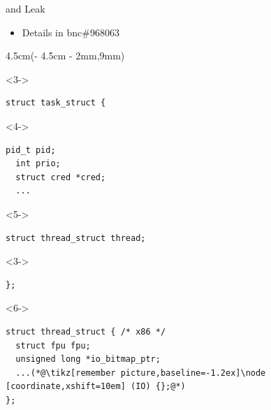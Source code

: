 \begin{frame}[fragile]{\trin and  Leak}
\begin{itemize}
    \pause

    \item Details in bnc\#968063
  \end{itemize}

  \begin{textblock*}{4.5cm}(\paperwidth - 4.5cm - 2mm,9mm)
  \begin{onlyenv}<3->
  \begin{lstlisting}[belowskip=0pt]
struct task_struct {
  \end{lstlisting}
  \end{onlyenv}
  \begin{visibleenv}<4->
  \begin{lstlisting}[aboveskip=0pt,belowskip=0pt]
  pid_t pid;
  int prio;
  struct cred *cred;
  ...
  \end{lstlisting}
  \end{visibleenv}
  \begin{visibleenv}<5->
  \begin{lstlisting}[aboveskip=0pt,belowskip=0pt]
  struct thread_struct thread;
  \end{lstlisting}
  \end{visibleenv}
  \begin{onlyenv}<3->
  \begin{lstlisting}[aboveskip=0pt,belowskip=0pt]
};
  \end{lstlisting}
  \end{onlyenv}
  \begin{onlyenv}<6->
  \begin{lstlisting}[aboveskip=0pt,belowskip=0pt]
struct thread_struct { /* x86 */
  struct fpu fpu;
  unsigned long *io_bitmap_ptr;
  ...(*@\tikz[remember picture,baseline=-1.2ex]\node [coordinate,xshift=10em] (IO) {};@*)
};
  \end{lstlisting}
  \end{onlyenv}
  \end{textblock*}



\end{frame}

